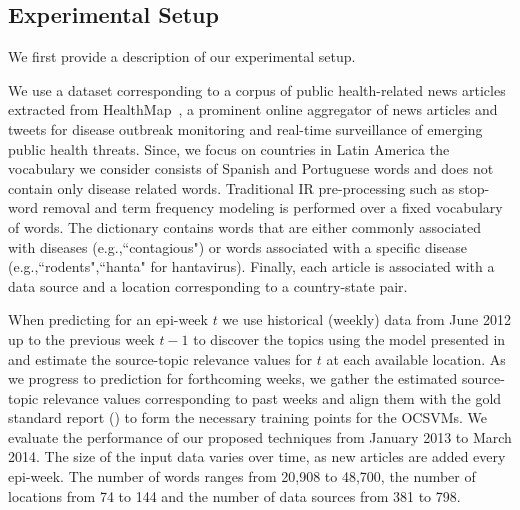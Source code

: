 \documentclass[twoside,leqno,twocolumn]{article}
\begin{document}
\subsection{Experimental Setup} We first provide a description of our experimental setup.

\vspace{5pt} We use a dataset corresponding to a corpus of public health-related news articles extracted from HealthMap~\cite{healthmap}, a prominent online aggregator of news articles and tweets for disease outbreak monitoring and real-time surveillance of emerging public health threats. Since, we focus on countries in Latin America the vocabulary we consider consists of Spanish and Portuguese words and does not contain only disease related words. Traditional IR pre-processing such as stop-word removal and term frequency modeling is performed over a fixed vocabulary of words. The dictionary contains words that are either commonly associated with diseases (e.g.,``contagious") or words associated with a specific disease (e.g.,``rodents",``hanta" for hantavirus). Finally, each article is associated with a data source and a location corresponding to a country-state pair.

When predicting for an epi-week $t$ we use historical (weekly) data from June 2012 up to the previous week $t-1$ to discover the topics using the model presented in  and estimate the source-topic relevance values for $t$ at each available location. As we progress to prediction for forthcoming weeks, we gather the estimated source-topic relevance values corresponding to past weeks and align them with the gold standard report () to  form the necessary training points for the OCSVMs. We evaluate the performance of our proposed techniques from January 2013 to March 2014. The size of the input data varies over time, as new articles are added every epi-week. The number of words ranges from 20,908 to 48,700, the number of locations from 74 to 144 and the number of data sources from 381 to 798.
\end{document}
